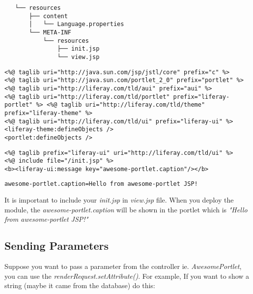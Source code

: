 \lstset{language=bash}
\begin{minipage}{\linewidth}
\begin{lstlisting}
   └── resources
       ├── content
       │   └── Language.properties
       └── META-INF
           └── resources
               ├── init.jsp
               └── view.jsp
\end{lstlisting}
\end{minipage}

\lstset{language=jsp}
\begin{minipage}{\linewidth}
\begin{lstlisting}[caption=init.jsp]
<%@ taglib uri="http://java.sun.com/jsp/jstl/core" prefix="c" %>
<%@ taglib uri="http://java.sun.com/portlet_2_0" prefix="portlet" %>
<%@ taglib uri="http://liferay.com/tld/aui" prefix="aui" %>
<%@ taglib uri="http://liferay.com/tld/portlet" prefix="liferay-portlet" %> <%@ taglib uri="http://liferay.com/tld/theme" prefix="liferay-theme" %>
<%@ taglib uri="http://liferay.com/tld/ui" prefix="liferay-ui" %>  
<liferay-theme:defineObjects />
<portlet:defineObjects />
\end{lstlisting}
\end{minipage}

\lstset{language=jsp}
\begin{minipage}{\linewidth}
\begin{lstlisting}[caption=view.jsp]
<%@ taglib prefix="liferay-ui" uri="http://liferay.com/tld/ui" %>
<%@ include file="/init.jsp" %>
<b><liferay-ui:message key="awesome-portlet.caption"/></b>
\end{lstlisting}
\end{minipage}

\lstset{language=properties}
\begin{lstlisting}[caption=Language.properties]
awesome-portlet.caption=Hello from awesome-portlet JSP!
\end{lstlisting}

It is important to include your \textit{init.jsp} in \textit{view.jsp} file. When you deploy the module, the \textit{awesome-portlet.caption} will be shown in the portlet which is \textit{"Hello from awesome-portlet JSP!"}

\subsection{Sending Parameters}

Suppose you want to pass a parameter from the controller ie. \textit{AwesomePortlet}, you can use the \textit{renderRequest.setAttribute()}. For example, If you want to show a string (maybe it came from the database) do this:

